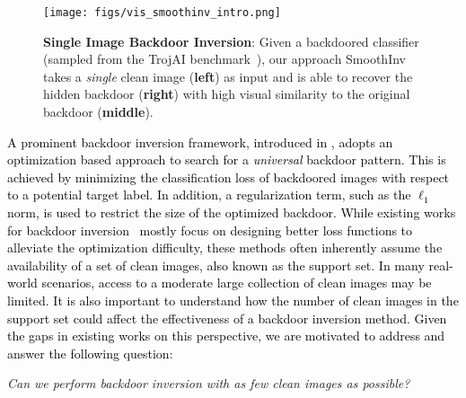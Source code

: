 \documentclass[10pt,twocolumn,letterpaper]{article}
\newcommand{\ms}[1]{\textcolor{black}{#1}}
\begin{document}
\begin{figure}[t!]
\centering
\texttt{[image: figs/vis\_smoothinv\_intro.png]}
\caption{\textbf{Single Image Backdoor Inversion}: Given a backdoored classifier (sampled from the TrojAI benchmark~\cite{trojai_data}), our approach SmoothInv takes a \textit{single} clean image (\textbf{left}) as input and is able to recover the hidden backdoor (\textbf{right}) with high visual similarity to the original backdoor (\textbf{middle}).}
\label{fig:backdoor_initial}
\end{figure}

\ms{A prominent backdoor inversion framework, introduced in \cite{nc2019wang}, adopts an optimization based approach to search for a \textit{universal} backdoor pattern. This is achieved by minimizing the classification loss of backdoored images with respect to a potential target label. 
In addition, a regularization term, such as the $\ell_{1}$ norm, is used to restrict the size of the optimized backdoor.
While existing works for backdoor inversion~\cite{hu2022topo,pixelinv} mostly focus on designing better loss functions to alleviate the optimization difficulty, these methods often inherently assume the availability of a set of clean images, also known as the support set.  
In many real-world scenarios, access to a moderate large collection of clean images may be limited. It is also important to understand how the number of clean images in the support set could affect the effectiveness of a backdoor inversion method. Given the gaps in existing works on this perspective, we are motivated to address and answer the following question:}

\textit{Can we perform backdoor inversion with as few clean images as possible?}

\end{document}
